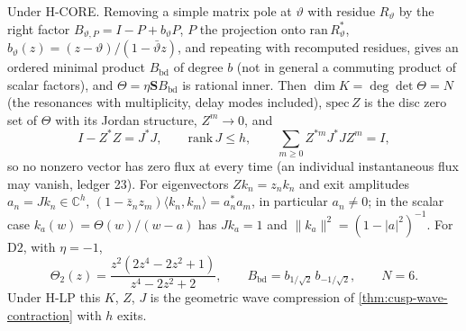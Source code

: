 \begin{theorem}
\label{thm:h-exit-model}
Under H-CORE. Removing a simple matrix pole at $\vartheta$ with residue $R_\vartheta$ by the right factor
$B_{\vartheta,P} = I-P+b_\vartheta P$, $P$ the projection onto $\mathrm{ran}\,R_\vartheta^{*}$, $b_\vartheta(z) = (z-\vartheta)/(1-\bar\vartheta z)$,
and repeating with recomputed residues, gives an ordered minimal product $B_{\mathrm{bd}}$ of degree $b$ (not in
general a commuting product of scalar factors), and $\Theta = \eta\mathbf SB_{\mathrm{bd}}$ is rational inner. Then
$\dim K = \deg\det\Theta = N$ (the resonances with multiplicity, delay modes included), $\mathrm{spec}\,Z$ is the
disc zero set of $\Theta$ with its Jordan structure, $Z^m\to0$, and
\[
I-Z^{*}Z = J^{*}J,\qquad \mathrm{rank}\,J\le h,\qquad \sum_{m\ge0}Z^{*m}J^{*}JZ^m = I ,
\]
so no nonzero vector has zero flux at every time (an individual instantaneous flux may vanish, ledger 23).
For eigenvectors $Zk_n = z_nk_n$ and exit amplitudes $a_n = Jk_n\in\mathbb C^h$,
$(1-\bar z_nz_m)\langle k_n,k_m\rangle = a_n^{*}a_m$, in particular $a_n\ne0$; in the scalar case
$k_a(w) = \Theta(w)/(w-a)$ has $Jk_a = 1$ and $\|k_a\|^2 = (1-|a|^2)^{-1}$. For $\mathrm{D2}$, with $\eta = -1$,
\[
\Theta_2(z) = \frac{z^2(2z^4-2z^2+1)}{z^4-2z^2+2},\qquad B_{\mathrm{bd}} = b_{1/\sqrt2}\,b_{-1/\sqrt2},\qquad N = 6 .
\]
Under H-LP this $K$, $Z$, $J$ is the geometric wave compression of \cref{thm:cusp-wave-contraction} with $h$ exits.
\end{theorem}

